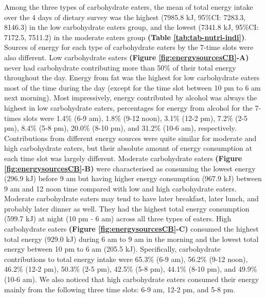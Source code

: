 Among the three types of carbohydrate eaters, the mean of total energy intake over the 4 days of dietary survey was the highest (7985.8 kJ, 95\%CI: 7283.3, 8146.3) in the low carbohydrate eaters group, and the lowest (7341.8 kJ, 95\%CI: 7172.5, 7511.2) in the moderate eaters group \textbf{(Table \ref{tab:tab-nutri-indi})}. Sources of energy for each type of carbohydrate eaters by the 7-time slots were also different. Low carbohydrate eaters \textbf{(Figure \ref{fig:energysourcesCB}-A)} never had carbohydrate contributing more than 50\% of their total energy throughout the day. Energy from fat was the highest for low carbohydrate eaters most of the time during the day (except for the time slot between 10 pm to 6 am next morning). Most impressively, energy contributed by alcohol was always the highest in low carbohydrate eaters, percentages for energy from alcohol for the 7-times slots were 1.4\% (6-9 am), 1.8\% (9-12 noon), 3.1\% (12-2 pm), 7.2\% (2-5 pm), 8.4\% (5-8 pm), 20.0\% (8-10 pm), and 31.2\% (10-6 am), respectively. Contributions from different energy sources were quite similar for moderate and high carbohydrate eaters, but their absolute amount of energy consumption at each time slot was largely different. Moderate carbohydrate eaters \textbf{(Figure \ref{fig:energysourcesCB}-B)} were characterised as consuming the lowest energy (296.9 kJ) before 9 am but having higher energy consumption (967.9 kJ) between 9 am and 12 noon time compared with low and high carbohydrate eaters. Moderate carbohydrate eaters may tend to have later breakfast, later lunch, and probably later dinner as well. They had the highest total energy consumption (599.7 kJ) at night (10 pm - 6 am) across all three types of eaters. High carbohydrate eaters \textbf{(Figure \ref{fig:energysourcesCB}-C)} consumed the highest total energy (929.0 kJ) during 6 am to 9 am in the morning and the lowest total energy between 10 pm to 6 am (205.5 kJ). Specifically, carbohydrate contributions to total energy intake were 65.3\% (6-9 am), 56.2\% (9-12 noon), 46.2\% (12-2 pm), 50.3\% (2-5 pm), 42.5\% (5-8 pm), 44.1\% (8-10 pm), and 49.9\% (10-6 am). We also noticed that high carbohydrate eaters consumed their energy mainly from the following three time slots: 6-9 am, 12-2 pm, and 5-8 pm. 

